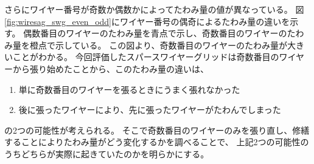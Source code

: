 \documentclass[../../main.tex]{subfiles}
\begin{document}
さらにワイヤー番号が奇数か偶数かによってたわみ量の値が異なっている。
図\ref{fig:wiresag_swg_even_odd}にワイヤー番号の偶奇によるたわみ量の違いを示す。
偶数番目のワイヤーのたわみ量を青点で示し、奇数番目のワイヤーのたわみ量を橙点で示している。
この図より、奇数番目のワイヤーのたわみ量が大きいことがわかる。
今回評価したスパースワイヤーグリッドは奇数番目のワイヤーから張り始めたことから、このたわみ量の違いは、
\begin{enumerate}
    \item 単に奇数番目のワイヤーを張るときにうまく張れなかった
    \item 後に張ったワイヤーにより、先に張ったワイヤーがたわんでしまった
\end{enumerate}
の2つの可能性が考えられる。
そこで奇数番目のワイヤーのみを張り直し、修繕することによりたわみ量がどう変化するかを調べることで、
上記2つの可能性のうちどちらが実際に起きていたのかを明らかにする。
\end{document}
